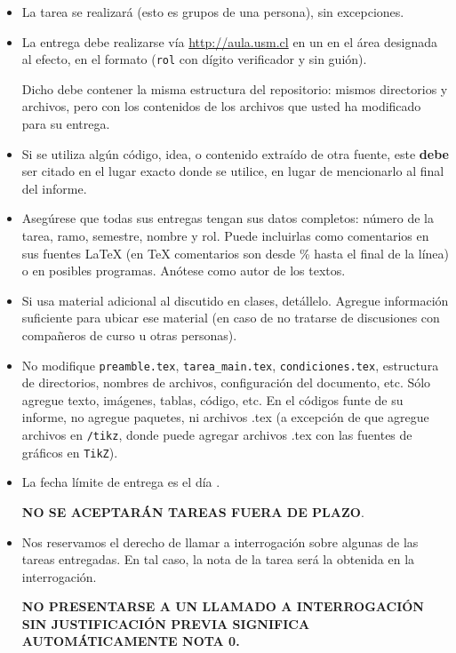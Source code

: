 
  \begin{itemize}
  \item
    La tarea se realizará 
    (esto es grupos de una persona),
    sin excepciones.
  \item
    La entrega debe realizarse vía \url{http://aula.usm.cl}
    en un  en el área designada al efecto,
    en el formato 
    (\texttt{rol} con dígito verificador y sin guión).

    Dicho  debe contener la misma estructura del repositorio: mismos directorios y archivos, pero con los contenidos de los archivos que usted ha modificado para su entrega.

  \item Si se utiliza algún código, idea, o contenido extraído de otra fuente, este \textbf{debe} ser citado en el lugar exacto donde se utilice, en lugar de mencionarlo al final del informe. 
  \item
    Asegúrese que todas sus entregas tengan sus datos completos:
    número de la tarea, ramo, semestre, nombre y rol.
    Puede incluirlas como comentarios en sus fuentes \LaTeX{}
    (en \TeX{} comentarios son desde \% hasta el final de la línea)
    o en posibles programas.
    Anótese como autor de los textos.
 
  \item
    Si usa material adicional al discutido en clases,
    detállelo.
    Agregue información suficiente para ubicar ese material
    (en caso de no tratarse de discusiones con compañeros de curso
     u otras personas).
    \item No modifique \texttt{preamble.tex}, \texttt{tarea\_main.tex}, \texttt{condiciones.tex}, estructura de directorios, nombres de archivos, configuración del documento, etc. Sólo agregue texto, imágenes, tablas, código, etc. En el códigos funte de su informe, no agregue paquetes, ni archivos .tex (a excepción de que agregue archivos en \texttt{/tikz}, donde puede agregar archivos .tex con las fuentes de gráficos en \texttt{TikZ}).

  \item

    La fecha límite de entrega es el día \tcm{\deadline}.

    \begin{center}
        \Large{
          \textbf{NO SE ACEPTARÁN TAREAS FUERA DE PLAZO}.
        }
        \normalsize
    \end{center}
     
    
  \item
    Nos reservamos el derecho de llamar a interrogación
    sobre algunas de las tareas entregadas.
    En tal caso,
    la nota de la tarea será la obtenida en la interrogación.
    \begin{center}
      \Large{
        \textbf{NO PRESENTARSE A UN LLAMADO A INTERROGACIÓN SIN JUSTIFICACIÓN PREVIA SIGNIFICA AUTOMÁTICAMENTE NOTA 0.}
      }
    \end{center}
    
  \end{itemize}
